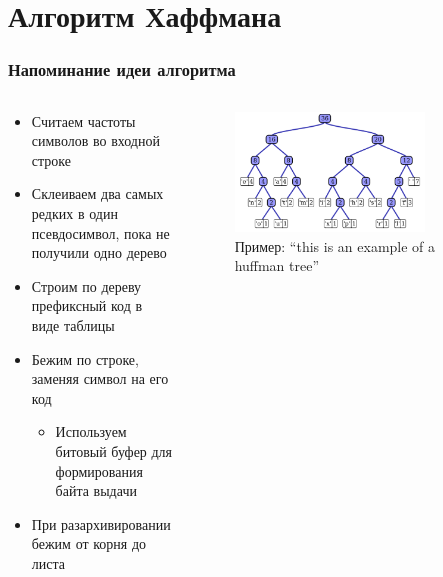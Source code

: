 \documentclass{../../slides-style}
\begin{document}
    \begin{frame}[plain]
        \titlepage
    \end{frame}

    \section{Алгоритм Хаффмана}

    \begin{frame}
        \frametitle{Напоминание идеи алгоритма}
        \begin{columns}
            \begin{column}{0.5\textwidth}
                \begin{itemize}
                    \item Считаем частоты символов во входной строке
                    \item Склеиваем два самых редких в один псевдосимвол, пока не получили одно дерево
                    \item Строим по дереву префиксный код в виде таблицы
                    \item Бежим по строке, заменяя символ на его код
                    \begin{itemize}
                        \item Используем битовый буфер для формирования байта выдачи
                    \end{itemize}
                    \item При разархивировании бежим от корня до листа
                \end{itemize}
            \end{column}
            \begin{column}{0.5\textwidth}
                \begin{figure}[htp]
                    \centering
                    \includegraphics[width=0.8\textwidth]{huffman-tree.png}
                    Пример: ``this is an example of a huffman tree''
                \end{figure}
            \end{column}
        \end{columns}
    \end{frame}
\end{document}

